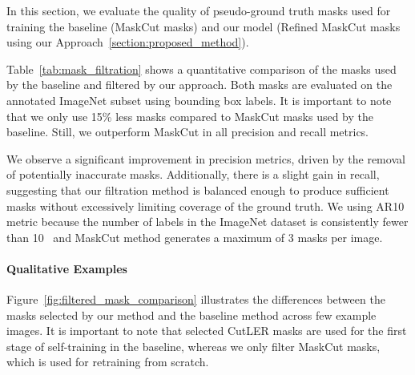 \begin{table}[htbp]
	\centering
	\caption[\textbf{Quantitative Comparison of CutLER vs Proposed Mask Filtration Methods}]{\textbf{Quantitative Comparison of CutLER vs Our Proposed Filtration Methods} evaluated on annotated ImageNet subset using bounding box labels.}
	\label{tab:mask_filtration}
\end{table}

In this section, we evaluate the quality of pseudo-ground truth masks used for training the baseline (MaskCut masks) and our model (Refined MaskCut masks using our Approach~\ref{section:proposed_method}).

Table~\ref{tab:mask_filtration} shows a quantitative comparison of the masks used by the baseline and filtered by our approach. Both masks are evaluated on the annotated ImageNet subset using bounding box labels. It is important to note that we only use 15\% less masks compared to MaskCut masks used by the baseline. Still, we outperform MaskCut in all precision and recall metrics. 

We observe a significant improvement in precision metrics, driven by the removal of potentially inaccurate masks. Additionally, there is a slight gain in recall, suggesting that our filtration method is balanced enough to produce sufficient masks without excessively limiting coverage of the ground truth. We using AR10 metric because the number of labels in the ImageNet dataset is consistently fewer than 10~\cite{deng2009imagenet} and MaskCut method generates a maximum of 3 masks per image.

\paragraph{Qualitative Examples}
Figure~\ref{fig:filtered_mask_comparison} illustrates the differences between the masks selected by our method and the baseline method across few example images. It is important to note that selected CutLER masks are used for the first stage of self-training in the baseline, whereas we only filter MaskCut masks, which is used for retraining from scratch.

